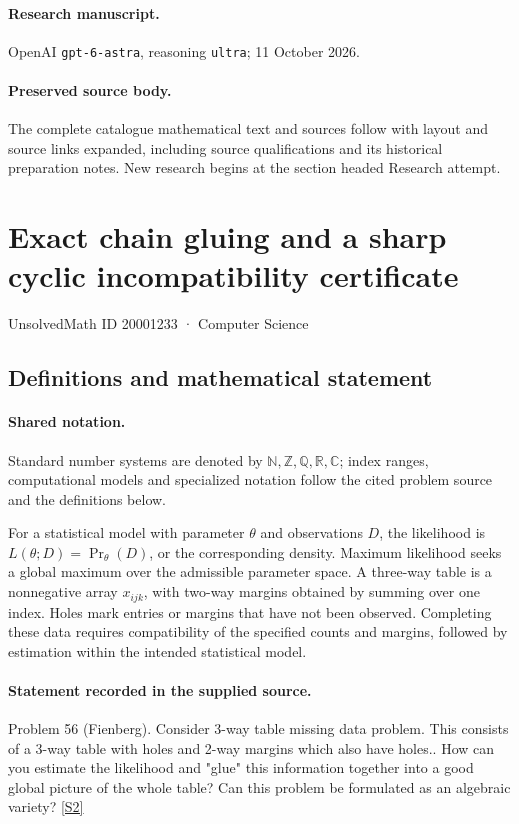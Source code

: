 \documentclass[11pt]{article}
\begin{document}
\paragraph{Research manuscript.} OpenAI \texttt{gpt-6-astra}, reasoning \texttt{ultra}; 11 October 2026.
\paragraph{Preserved source body.} The complete catalogue mathematical text and sources follow with layout and source links expanded, including source qualifications and its historical preparation notes. New research begins at the section headed Research attempt.

\section{Exact chain gluing and a sharp cyclic incompatibility certificate}\label{20001233}
{\small UnsolvedMath ID 20001233 · Computer Science}
\subsection{Definitions and mathematical statement}

\paragraph{Shared notation.}Standard number systems are denoted by $\mathbb N,\mathbb Z,\mathbb Q,\mathbb R,\mathbb C$; index ranges, computational models and specialized notation follow the cited problem source and the definitions below.


For a statistical model with parameter $\theta$ and observations $D$, the likelihood is $L(\theta;D)=\Pr_\theta(D)$, or the corresponding density. Maximum likelihood seeks a global maximum over the admissible parameter space. A three-way table is a nonnegative array $x_{ijk}$, with two-way margins obtained by summing over one index. Holes mark entries or margins that have not been observed. Completing these data requires compatibility of the specified counts and margins, followed by estimation within the intended statistical model.
\paragraph{Statement recorded in the supplied source.}
Problem 56 (Fienberg). Consider 3-way table missing data problem. This consists of a 3-way table with holes and 2-way margins which also have holes.. How can you estimate the likelihood and "glue" this information together into a good global picture of the whole table? Can this problem be formulated as an algebraic variety? \href{https://aimath.org/WWN/compalgstat/compalgstat.pdf}{[S2]}
\end{document}
